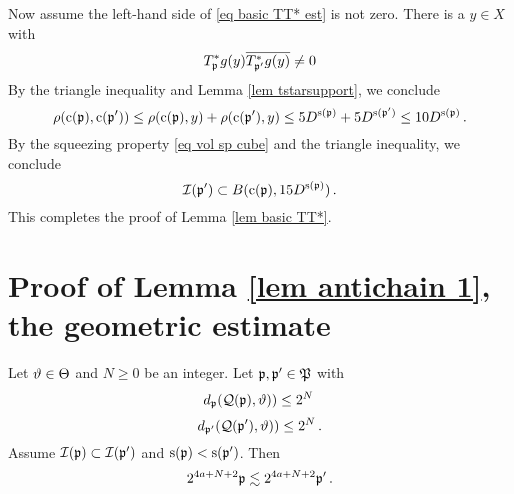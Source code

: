 Now assume the left-hand side of \eqref{eq basic TT* est} is not zero.
There is a $y\in X$ with
\begin{equation}
    T^*_{\mathfrak p}g(y)\overline{T^*_{\mathfrak p'}g(y)}\neq 0
\end{equation}
By the triangle inequality and Lemma \ref{lem tstarsupport}, we conclude
\begin{equation}
   \rho(\mathrm{c}(\mathfrak p),\mathrm{c}(\mathfrak p'))\le  \rho(\mathrm{c}(\mathfrak p),y) +\rho(\mathrm{c}(\mathfrak p'),y)
   \le 5D^{\mathrm{s}(\mathfrak p)}+5D^{\mathrm{s}(\mathfrak p')}\le 10 D^{\mathrm{s}(\mathfrak p)}\, .
\end{equation}
By the squeezing property \eqref{eq vol sp cube} and the triangle inequality,
we conclude
\begin{equation}
    \mathcal{I}(\mathfrak p') \subset B(\mathrm{c}(\mathfrak p), 15D^{\mathrm{s}(\mathfrak p)})\, .
\end{equation}
   This completes the proof of Lemma  \ref{lem basic TT*}.





\section{Proof of Lemma \ref{lem antichain 1}, the geometric estimate}
\label{subsec geolem}


\begin{lemma}\label{lem a geo}
Let $\vartheta\in \Theta$ and $N\ge0$ be an integer.
Let $\mathfrak p, \mathfrak p'\in \mathfrak P$ with
\begin{equation}\label{eqassumedismfa}
    d_{\mathfrak p}(\mathcal{Q}(\mathfrak p), \vartheta))\le 2^N\,
\end{equation}
\begin{equation}\label{eqassumedismfap}
    d_{\mathfrak p'}(\mathcal{Q}(\mathfrak p'), \vartheta))\le 2^N\, .
\end{equation}
Assume $\mathcal{I}(\mathfrak p)\subset \mathcal{I}(\mathfrak p')$ and $\mathrm{s}(\mathfrak p)<\mathrm{s}(\mathfrak p')$.
Then
\begin{equation}\label{lp'lp''}2^{4a+N+2}\mathfrak p\lesssim 2^{4a+N+2} \mathfrak p'\, .
\end{equation}
\end{lemma}

